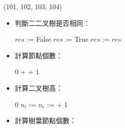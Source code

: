 \item \begin{theorem}{(101, 102, 103, 104)} \quad\quad \begin{itemize}
        \item 判斷二二叉樹是否相同：\begin{algorithm}[H]
            \begin{algorithmic}[1]
                    \State $res$ := False
                        \State $res$ := True
                                \State $res$ := 
                            \EndIf
                        \EndIf
                    \EndIf
                    \State \Return $res$
                \EndFunction
            \end{algorithmic}
        \end{algorithm}
        \item 計算節點個數：\begin{algorithm}[H]
            \begin{algorithmic}[1]
                        \State \Return $0$
                    \Else
                        \State \Return {} +  + 1
                    \EndIf
                \EndFunction
            \end{algorithmic}
        \end{algorithm}
        \item 計算二叉樹高：\begin{algorithm}[H]
            \begin{algorithmic}[1]
                        \State \Return $0$
                    \Else
                        \State $n_l$ := 
                        \State $n_r$ := 
                        \State \Return {} + 1
                    \EndIf
                \EndFunction
            \end{algorithmic}
        \end{algorithm}
        \item 計算樹葉節點個數：\begin{algorithm}[H]

\end{algorithm}
\end{itemize}
\end{theorem}
